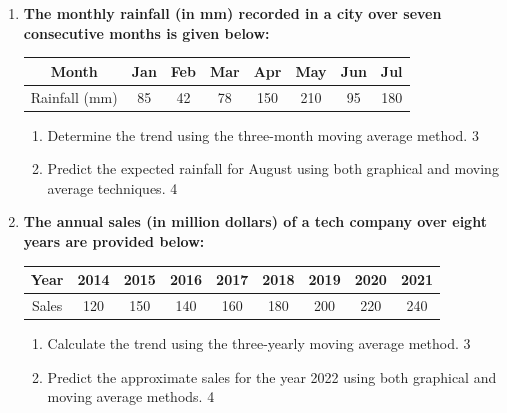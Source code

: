 \documentclass[a4paper,oneside]{book}
\begin{document}
\begin{enumerate}
\begin{enumerate}
\item
Compute the trend using the three-monthly moving average method. \hfill 3
\item
Estimate the approximate average temperature for the month of April using both graphical and moving average methods, and compare the projections. \hfill 4
\end{enumerate}

\item  
\textbf{The monthly rainfall (in mm) recorded in a city over seven consecutive months is given below:}  

\begin{table}[h]  
\centering  
\begin{tabular}{cccccccc}  
Month     & Jan  & Feb  & Mar  & Apr  & May  & Jun  & Jul  \\ \hline  
Rainfall (mm) & 85   & 42   & 78   & 150  & 210  & 95   & 180    
\end{tabular}  
\end{table}  

\begin{enumerate}  
    \item  
    Determine the trend using the three-month moving average method. \hfill 3  
    \item  
    Predict the expected rainfall for August using both graphical and moving average techniques. \hfill 4  
\end{enumerate}  


\item
\textbf{The annual sales (in million dollars) of a tech company over eight years are provided below:}

\begin{table}[h]
\centering
\begin{tabular}{ccccccccc}
Year     & 2014 & 2015 & 2016 & 2017 & 2018 & 2019 & 2020 & 2021 \\ \hline
Sales    & 120  & 150  & 140  & 160  & 180  & 200  & 220  & 240   
\end{tabular}
\end{table}

\begin{enumerate}
    \item  
    Calculate the trend using the three-yearly moving average method. \hfill 3
    \item
    Predict the approximate sales for the year 2022 using both graphical and moving average methods. \hfill 4
\end{enumerate}


\end{enumerate}
\end{document}
